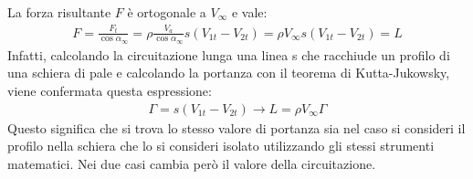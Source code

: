 La forza risultante $F$ è ortogonale a $V_\infty$ e vale:
\begin{align*}
F=\frac{F_t}{\cos \alpha_{\infty}}=\rho \frac{V_a}{\cos \alpha_{\infty}}s(V_{1t}-V_{2t})=\rho V_\infty s (V_{1t}-V_{2t})=L
\end{align*}
Infatti, calcolando la circuitazione lunga una linea s che racchiude un profilo di una schiera di pale e calcolando la portanza con il teorema di Kutta-Jukowsky, viene confermata questa espressione:
\begin{align*}
\Gamma=s(V_{1t}-V_{2t}) \rightarrow L=\rho V_\infty \Gamma
\end{align*}
Questo significa che si trova lo stesso valore di portanza sia nel caso si consideri il profilo nella schiera che lo si consideri isolato utilizzando gli stessi strumenti matematici. Nei due casi cambia però il valore della circuitazione.
